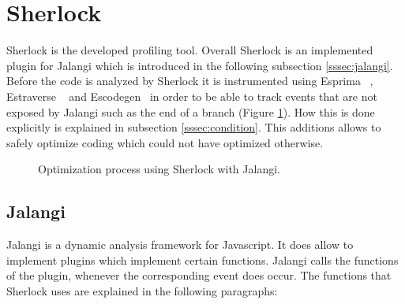 \section{Sherlock}
\label{sec:sherlock}
Sherlock is the developed profiling tool. Overall Sherlock is an implemented plugin for Jalangi
 which is introduced in the following subsection \ref{sssec:jalangi}. Before the code is 
 analyzed by Sherlock it is instrumented using Esprima ~\cite{esprima}, Estraverse ~\cite{estraverse} 
 and Escodegen~\cite{escodegen} in order to be able to track events that are not exposed by Jalangi 
 such as the end of a branch (Figure \ref{fig:architecture}). How this is done explicitly is explained 
 in subsection \ref{sssec:condition}. This additions allows to safely optimize coding which could not 
 have optimized otherwise. 


\begin{figure}[htbp]
\centering
{}
\caption{Optimization process using Sherlock with Jalangi.}\label{fig:architecture}
\end{figure}

\subsection{Jalangi}
Jalangi is a dynamic analysis framework for Javascript. It does allow to implement plugins which 
implement certain functions. Jalangi calls the functions of the plugin, whenever the corresponding 
event does occur. The functions that Sherlock uses are explained in the following paragraphs:

